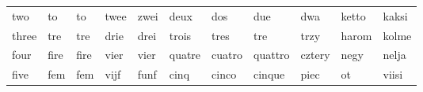 \documentclass[a4paper, 20pt]{article}
\begin{document}
\begin{table}[h]
{\begin{tabular}{lllllllllll}
two                                                  & to                                                    & to                                                   & twee                                                    & zwei                                                 & deux                                                   & dos                                                    & due                                                    & dwa                                                  & ketto                                                 & kaksi                                                \\
three                                                & tre                                                   & tre                                                  & drie                                                    & drei                                                 & trois                                                  & tres                                                   & tre                                                    & trzy                                                 & harom                                                 & kolme                                                \\
four                                                 & fire                                                  & fire                                                 & vier                                                    & vier                                                 & quatre                                                 & cuatro                                                 & quattro                                                & cztery                                               & negy                                                  & nelja                                                \\
five                                                 & fem                                                   & fem                                                  & vijf                                                    & funf                                                 & cinq                                                   & cinco                                                  & cinque                                                 & piec                                                 & ot                                                    & viisi                                                \\

\end{tabular}}
\end{table}
\end{document}
